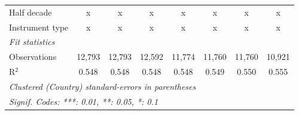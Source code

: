 \begin{tabular}{lccccccc}
   Half decade                                                                                 & x            & x             & x            & x             & x             & x             & x\\  
   Instrument type                                                                             & x            & x             & x            & x             & x             & x             & x\\  
   \midrule \emph{Fit statistics}\\
   Observations                                                                                & 12,793       & 12,793        & 12,592       & 11,774        & 11,760        & 11,760        & 10,921\\  
   R$^2$                                                                                       & 0.548        & 0.548         & 0.548        & 0.548         & 0.549         & 0.550         & 0.555\\  
   \midrule
   \multicolumn{8}{l}{\emph{Clustered (Country) standard-errors in parentheses}}\\
   \multicolumn{8}{l}{\emph{Signif. Codes: ***: 0.01, **: 0.05, *: 0.1}}\\
\end{tabular}
\par\endgroup


